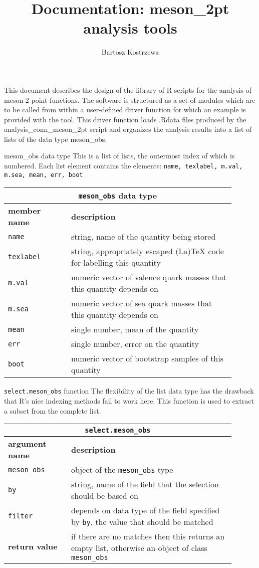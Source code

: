 \documentclass[10pt,a4paper]{article}
\author{Bartosz Kostrzewa}
\title{Documentation: meson\_2pt analysis tools}
\begin{document}
This document describes the design of the library of R scripts for the analysis of meson 2 point functions.
The software is structured as a set of modules which are to be called from within a user-defined driver function for which an example is provided with the tool.
This driver function loads .Rdata files produced by the {\ttfamily analysis\_conn\_meson\_2pt} script and organizes the analysis results into a list of lists of the data type {\ttfamily meson\_obs}.

\begin{section}{{\ttfamily meson\_obs} data type}
This is a list of lists, the outermost index of which is numbered.
Each list element contains the elements: {\tt name, texlabel, m.val, m.sea, mean, err, boot}

{ \centering
\begin{tabular}{|p{0.25\linewidth}|p{0.65\linewidth}|}
\hline
\multicolumn{2}{|c|}{ {\tt meson\_obs} data type } \\
\hline \hline \textbf{member name} & \textbf{description} \\ \hline
{\tt name} & string, name of the quantity being stored \\ 
{\tt texlabel}  & string, appropriately escaped (La)TeX code for labelling this quantity  \\ 
{\tt m.val} & numeric vector of valence quark masses that this quantity depends on \\
{\tt m.sea} & numeric vector of sea quark masses that this quantity depends on \\
{\tt mean} & single number, mean of the quantity \\
{\tt err} & single number, error on the quantity \\
{\tt boot} & numeric vector of bootstrap samples of this quantity \\
\hline 
\end{tabular}
} %

\begin{subsection}{{\tt select.meson\_obs} function}
The flexibility of the list data type has the drawback that R's nice indexing methods fail to work here.
This function is used to extract a subset from the complete list.

{ \centering
\begin{tabular}{|p{0.25\linewidth}|p{0.65\linewidth}|}
\hline
\multicolumn{2}{|c|}{ {\tt select.meson\_obs} } \\
\hline \hline \textbf{argument name} & \textbf{description} \\
\hline {\tt meson\_obs} & object of the {\tt meson\_obs} type \\ 
{\tt by} & string, name of the field that the selection should be based on \\ 
{\tt filter} & depends on data type of the field specified by {\tt by}, the value that should be matched \\ 
\hline \hline
\textbf{return value} & if there are no matches then this returns an empty list, otherwise an object of class {\tt meson\_obs} \\
\hline
\end{tabular}
} %


\end{subsection}
\end{section}
\end{document}
